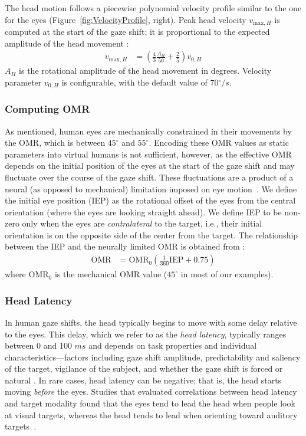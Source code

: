 The head motion follows a piecewise polynomial velocity profile similar to the one for the eyes (Figure~\ref{fig:VelocityProfile}, right). Peak head velocity $v_{\mathrm{max},H}$ is computed at the start of the gaze shift; it is proportional to the expected amplitude of the head movement \citep{guitton1987gaze}:
%
\begin{align} \label{eq:AndristVmaxH}
v_{\mathrm{max},H} &= (\frac{4}{3} \frac{A_H}{50} + \frac{2}{5}) v_{0,H}
\end{align}
%
$A_H$ is the rotational amplitude of the head movement in degrees. Velocity parameter $v_{0,H}$ is configurable, with the default value of 70$^{\circ}/s$.

\subsubsection{Computing OMR}

As mentioned, human eyes are mechanically constrained in their movements by the OMR, which is between $45^{\circ}$ and $55^{\circ}$. Encoding these OMR values as static parameters into virtual humans is not sufficient, however, as the effective OMR depends on the initial position of the eyes at the start of the gaze shift and may fluctuate over the course of the gaze shift. These fluctuations are a product of a neural (as opposed to mechanical) limitation imposed on eye motion~\citep{guitton1987gaze}. We define the initial eye position (IEP) as the rotational offset of the eyes from the central orientation (where the eyes are looking straight ahead). We define IEP to be non-zero only when the eyes are \emph{contralateral} to the target, i.e., their initial orientation is on the opposite side of the center from the target. The relationship between the IEP and the neurally limited OMR is obtained from \citet{guitton1987gaze}:
%
\begin{align} \label{eq:AndristOMRIEP}
\mathrm{OMR} &= \mathrm{OMR}_0 (\frac{1}{360} \mathrm{IEP} + 0.75)
\end{align}
%
where $\mathrm{OMR}_0$ is the mechanical OMR value ($45^{\circ}$ in most of our examples).

\subsubsection{Head Latency}

In human gaze shifts, the head typically begins to move with some delay relative to the eyes. This delay, which we refer to as the \emph{head latency}, typically ranges between 0 and 100 $ms$ and depends on task properties and individual characteristics---factors including gaze shift amplitude, predictability and saliency of the target, vigilance of the subject, and whether the gaze shift is forced or natural \citep{pelz2001coordination,zangemeister1982types}. In rare cases, head latency can be negative; that is, the head starts moving \emph{before} the eyes. Studies that evaluated correlations between head latency and target modality found that the eyes tend to lead the head when people look at visual targets, whereas the head tends to lead when orienting toward auditory targets~\citep{goldring1996combined,goossens1997human}.

